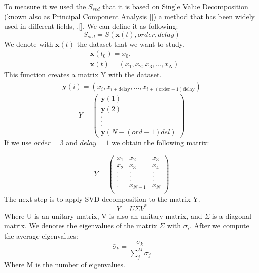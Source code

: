 \documentclass{article}
\begin{document}
To measure it we used the $S_{svd}$ that it is based on Single Value Decomposition (known also as Principal Component Analysis [\citeyear{PCA}]) a method that has been widely used in different fields, ,[\citeyear{TamingChaos}].
We can define it as following:
\begin{equation}
    S_{svd}=S(\mathbf{x}(t),order,delay)
\end{equation}
We denote with $\mathbf{x}(t)$ the dataset that we want to study. 
\begin{equation}
\begin{split}
    &\mathbf{x}(t_0)=x_{0},\\
    &\mathbf{x}(t)=(x_1,x_2,x_3,\ldots,x_N)
\end{split}
\end{equation}
This function creates a matrix Y with the dataset.
\begin{equation}
\begin{split}
    \mathbf{y}(i)=(x_i,x_{i+\text{delay}}, ...,x_{i+(\text{order}-1)\text{delay}})
\end{split}
\end{equation}
\begin{equation*}
    Y = 
\begin{pmatrix}
\mathbf{y}(1) \\
\mathbf{y}(2) \\
. \\
. \\
. \\
\mathbf{y}(N-(ord-1)del)
\end{pmatrix}
\end{equation*}
If we use $order=3$ and $delay=1$ we obtain the following matrix:

\begin{equation*}
    Y = 
\begin{pmatrix}
x_1 & x_2 & x_3 \\
x_2 & x_3 & x_4 \\
. & . & .\\
. & . & .\\
. & . & .\\
. & x_{N-1} & x_N \\
\end{pmatrix}
\end{equation*}
The next step is to apply SVD decomposition to the matrix Y.
\begin{equation}
    Y=U\Sigma V^{*}
\end{equation}
Where U is an unitary matrix, V is also an unitary matrix, and $\Sigma$ is a diagonal matrix.
We denotes the eigenvalues of the matrix $\Sigma$ with $\sigma_i$. After we compute the average eigenvalues:
\begin{equation}
    \bar{\sigma}_k=\frac{\sigma_k}{\sum_j^M\sigma_j} 
\end{equation}
Where M is the number of eigenvalues.
\end{document}
